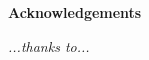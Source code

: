 \thispagestyle{empty}

\begin{center}
  {\bf \Huge Acknowledgements}
\end{center}

\vspace{4cm}

\emph{
  ...thanks to...
}

